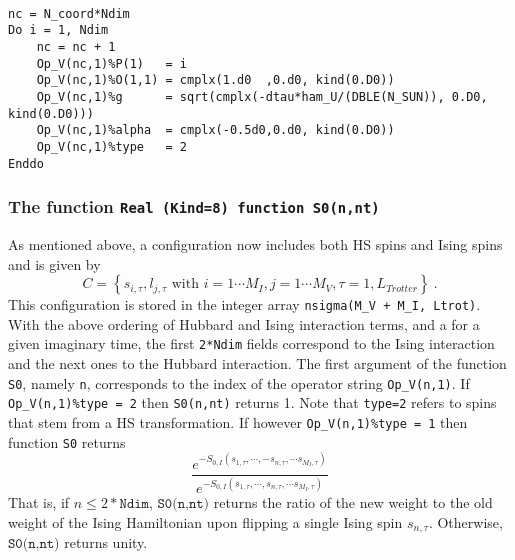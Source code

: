 \begin{lstlisting}

nc = N_coord*Ndim 
Do i = 1, Ndim
    nc = nc + 1
    Op_V(nc,1)%P(1)   = i 
    Op_V(nc,1)%O(1,1) = cmplx(1.d0  ,0.d0, kind(0.D0))
    Op_V(nc,1)%g      = sqrt(cmplx(-dtau*ham_U/(DBLE(N_SUN)), 0.D0, kind(0.D0)))
    Op_V(nc,1)%alpha  = cmplx(-0.5d0,0.d0, kind(0.D0))
    Op_V(nc,1)%type   = 2
Enddo

\end{lstlisting}

\subsubsection{The function \texttt{Real (Kind=8) function S0(n,nt)} }\label{sec:s0}

As mentioned above,  a configuration now includes both HS spins and Ising spins and is given by
\begin{equation}
	C = \left\{   s_{i,\tau} ,  l_{j,\tau}  \text{ with }  i=1\cdots M_I,  j = 1\cdots M_V,  \tau=1,L_{Trotter}  \right\}\:.
\end{equation}
This configuration is stored in the  integer array \texttt{nsigma(M\_V + M\_I, Ltrot)}.  With the above ordering of Hubbard and Ising interaction terms, and a for a given imaginary time, the first \texttt{2*Ndim} fields correspond to the Ising interaction and the next  ones to the Hubbard interaction.
The first   argument of the function \texttt{S0}, namely \texttt{n},  corresponds to the index of the operator  string 
\texttt{Op\_V(n,1)}. If \texttt{Op\_V(n,1)\%type = 2} then   \texttt{S0(n,nt)}  returns 1. Note that \texttt{type=2} refers to spins that stem from a  HS transformation. 
If however  \texttt{Op\_V(n,1)\%type = 1}  then function \texttt{S0}  returns
\begin{equation}
\frac{e^{-S_{0,I} \left(  s_{1,\tau},  \cdots,  - s_{n,\tau},  \cdots s_{M_I,\tau}   \right) } }{e^{-S_{0,I}  \left(  s_{1,\tau},  \cdots,   s_{n,\tau},  \cdots s_{M_I,\tau}   \right)   } }	
\end{equation}
That is,   if $n \leq 2* \texttt{Ndim} $,    $ \texttt{S0(n,nt)} $  returns the ratio of the new weight to the old weight  of the  Ising Hamiltonian upon flipping a single Ising spin $ s_{n,\tau} $.  Otherwise, $ \texttt{S0(n,nt)} $   returns unity. 

